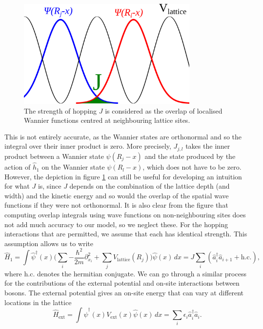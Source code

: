 \documentclass[a4paper, 10pt]{article}
\theoremstyle{plain}
\begin{document}
\begin{figure}[h!]
    \begin{center}
        \includegraphics[width=0.8\textwidth]{J_overlap_drawing_smaller}
    \end{center}
    \caption{\label{fig:J_overlap_drawing}
             The strength of hopping $J$ is considered as the overlap of
             localised Wannier functions centred at neighbouring lattice sites.}
\end{figure}
This is not entirely accurate, as the Wannier states are orthonormal and so the
integral over their inner product is zero. More precisely, $J_{j,l}$ takes the
inner product between a Wannier state $\psi(R_{j} - x)$ and the state produced
by the action of $\hat{h}_1$ on the Wannier state $\psi(R_{l} - x)$, which does
not have to be zero. However, the depiction in figure \ref{fig:J_overlap_drawing}
can still be useful for developing an intuition for what $J$ is, since $J$
depends on the combination of the lattice depth (and width) and the kinetic
energy and so would the overlap of the spatial wave functions if they were not
orthonormal. It is also clear from the figure that computing overlap integrals
using wave functions on non-neighbouring sites does not add much accuracy to our
model, so we neglect these. For the hopping interactions that are permitted, we
assume that each has identical strength. This assumption allows us to write
\begin{equation}
    \hat{H}_{1}
    =
    \int{\hat{\psi}^{\dagger}(x)
         \bigg(
            \!\sum_{i}{-\frac{\hbar^{2}}{2m} \partial_{x_{i}}^{2}} +
            \sum_{j}{V_{\text{lattice}}(R_{j})}
         \bigg)
         \hat{\psi}(x) \,dx}
    =
    J \sum_{i}{(\hat{a}^\dagger_{i}\hat{a}_{i+1} + \text{h.c.})},
\end{equation}
where $\text{h.c.}$ denotes the hermitian conjugate. We can go through a similar
process for the contributions of the external potential and on-site interactions
between bosons. The external potential gives an on-site energy that can vary at
different locations in the lattice
\begin{equation}
    \hat{H}_{\text{ext}}
    =
    \int{\hat{\psi}^{\dagger}(x) V_{\text{ext}}(x) \hat{\psi}(x) \,dx}
    =
    \sum_{i}{\epsilon_{i} \hat{a}_{i}^{\dagger} \hat{a}_{i}}.
\end{equation}
\end{document}
